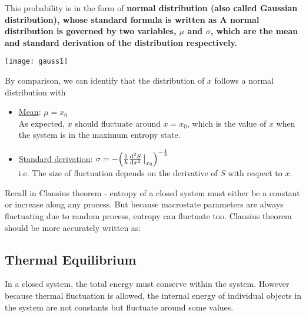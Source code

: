 \documentclass[class=article, crop=false, 12pt]{standalone}
\begin{document}
This probability is in the form of \bf{normal distribution} (also called Gaussian distribution),
whose standard formula is written as
A normal distribution is governed by two variables, $\mu$ and $\sigma$, 
which are the mean and standard derivation of the distribution respectively.

\begin{center}
    \begin{minipage}{0.9\linewidth}
        \centering
        \texttt{[image: gauss1]}
    \end{minipage}
\end{center}

By comparison, we can identify that the distribution of $x$ follows a normal distribution with
\begin{itemize}
    \item \ul{Mean}: $\mu=x_0$\\
    As expected, $x$ should fluctuate around $x=x_0$,
    which is the value of $x$ when the system is in the maximum entropy state.
    
    \item \ul{Standard derivation}: $\sigma = -\qty(\inv{k}\dv[2]{S}{x}\eval_{x_0})^{-\half}$\\
    i.e. The size of fluctuation depends on the  derivative of $S$ with respect to $x$.

\end{itemize}


\begin{notation}
    Recall in Clausius theorem - 
    entropy of a closed system must either be a constant 
    or increase along any process.
    But because macrostate parameters are always fluctuating due to random process,
    entropy can fluctuate too. 
    Clausius theorem should be more accurately written as:

\end{notation}




\subsection{Thermal Equilibrium}

In a closed system, the total energy must conserve within the system.
However because thermal fluctuation is allowed,
the internal energy of individual objects in the system are not constants
but fluctuate around some values.
\end{document}
